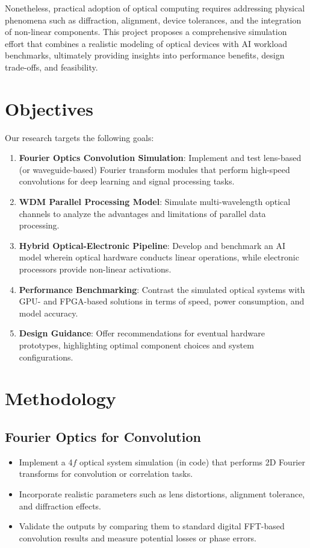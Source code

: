 \documentclass[conference]{IEEEtran}
\begin{document}
Nonetheless, practical adoption of optical computing requires addressing physical phenomena such as diffraction, alignment, device tolerances, and the integration of non-linear components. This project proposes a comprehensive simulation effort that combines a realistic modeling of optical devices with AI workload benchmarks, ultimately providing insights into performance benefits, design trade-offs, and feasibility.

\section{Objectives}
Our research targets the following goals:
\begin{enumerate}
    \item \textbf{Fourier Optics Convolution Simulation}: Implement and test lens-based (or waveguide-based) Fourier transform modules that perform high-speed convolutions for deep learning and signal processing tasks.
    \item \textbf{WDM Parallel Processing Model}: Simulate multi-wavelength optical channels to analyze the advantages and limitations of parallel data processing.
    \item \textbf{Hybrid Optical-Electronic Pipeline}: Develop and benchmark an AI model wherein optical hardware conducts linear operations, while electronic processors provide non-linear activations.
    \item \textbf{Performance Benchmarking}: Contrast the simulated optical systems with GPU- and FPGA-based solutions in terms of speed, power consumption, and model accuracy.
    \item \textbf{Design Guidance}: Offer recommendations for eventual hardware prototypes, highlighting optimal component choices and system configurations.
\end{enumerate}

\section{Methodology}

\subsection{Fourier Optics for Convolution}
\begin{itemize}
    \item Implement a 4\(f\) optical system simulation (in code) that performs 2D Fourier transforms for convolution or correlation tasks.
    \item Incorporate realistic parameters such as lens distortions, alignment tolerance, and diffraction effects.
    \item Validate the outputs by comparing them to standard digital FFT-based convolution results and measure potential losses or phase errors.
\end{itemize}
\end{document}
